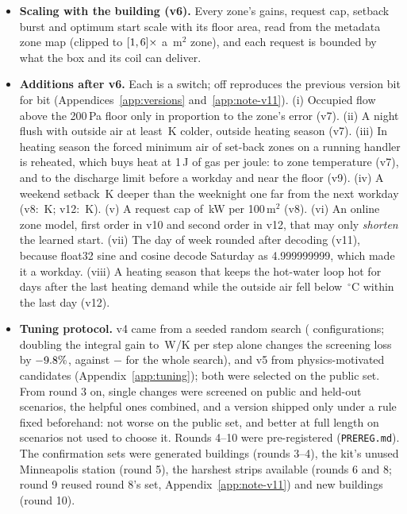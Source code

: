 \documentclass{article}
\begin{document}
\begin{itemize}
\begin{itemize}
  \item \emph{Hot water.} The setpoint is 350\,K whenever heating was requested in the last \ParHeatSeasonSteps{} steps (v12: \RTenSeasonSteps{} while the outside air fell below \RTenSeasonOatC\,$^\circ$C within a day) and 310\,K otherwise. Gas is billed as heat delivered, so hotter water costs only a tank dissipation of \TankLossExtraKw\,kW while widening the coils' reach; in the ablation (Table~\ref{tab:ablation12}) 330\,K instead changes the public loss by \RElvAbTwRel, so the setpoint hardly matters there.
  \end{itemize}
\item \textbf{Scaling with the building (v6).} Every zone's gains, request cap, setback burst and optimum start scale with its floor area, read from the metadata zone map (clipped to $[1, 6]\times$ a \ParAreaRef\,m$^2$ zone), and each request is bounded by what the box and its coil can deliver.
\item \textbf{Additions after v6.} Each is a switch; off reproduces the previous version bit for bit (Appendices~\ref{app:versions} and~\ref{app:note-v11}). (i) Occupied flow above the 200\,Pa floor only in proportion to the zone's error (v7). (ii) A night flush with outside air at least \ParRFFlushDt\,K colder, outside heating season (v7). (iii) In heating season the forced minimum air of set-back zones on a running handler is reheated, which buys heat at 1\,J of gas per joule: to zone temperature (v7), and to the discharge limit before a workday and near the floor (v9). (iv) A weekend setback \RTenWkExtLo\,K deeper than the weeknight one far from the next workday (v8: \RTenWkExtLoVEleven\,K; v12: \RTenWkExtLo\,K). (v) A request cap of \RFiveParQcapKw\,kW per 100\,m$^2$ (v8). (vi) An online zone model, first order in v10 and second order in v12, that may only \emph{shorten} the learned start. (vii) The day of week rounded after decoding (v11), because float32 sine and cosine decode Saturday as 4.999999999, which made it a workday. (viii) A heating season that keeps the hot-water loop hot for \RTenSeasonDays{} days after the last heating demand while the outside air fell below \RTenSeasonOatC\,$^\circ$C within the last day (v12).
\item \textbf{Tuning protocol.} v4 came from a seeded random search (\NTuneConfigs{} configurations; doubling the integral gain to \ParKiWPerKStep\,W/K per step alone changes the screening loss by $-9.8\%$, against $-$\RElvTuneGain{} for the whole search), and v5 from \NCandV{} physics-motivated candidates (Appendix~\ref{app:tuning}); both were selected on the public set. From round 3 on, single changes were screened on public and held-out scenarios, the helpful ones combined, and a version shipped only under a rule fixed beforehand: not worse on the public set, and better at full length on scenarios not used to choose it. Rounds 4--10 were pre-registered (\texttt{PREREG.md}). The confirmation sets were generated buildings (rounds 3--4), the kit's unused Minneapolis station (round 5), the harshest strips available (rounds 6 and 8; round 9 reused round 8's set, Appendix~\ref{app:note-v11}) and new buildings (round 10).
\end{itemize}
\end{document}
